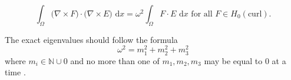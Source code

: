 \documentclass[format=acmsmall,screen,timestamp=false,a4paper]{acmart}
\newcommand{\R}{\mathbb{R}}
\newcommand\akg[1]{\textbf{\textcolor[rgb]{.5,0,1}{[Andrew: #1]}}}
\begin{document}



\begin{equation*}
    \int_\Omega \big(\nabla \times F\big) \cdot \big(\nabla \times E \big) \text{ d}x = \omega^2 \int_\Omega F \cdot E \text{ d}x \text{ for all } F \in H_0(\text{curl}).
\end{equation*}


The exact eigenvalues should follow the formula
\[ \omega^2 = m_1^2 + m_2^2 + m_3^2 \]
where $m_i \in \mathbb{N} \cup {0}$ and no more than one of $m_1, m_2, m_3$ may be equal to $0$ at a time \cite{rognes2010efficient}.

\end{document}
